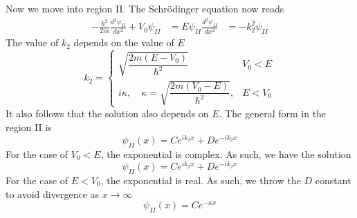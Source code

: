 \documentclass[../../../main.tex]{subfiles}
\begin{document}
Now we move into region II.
The Schrödinger equation now reads
\begin{align*}
    -\frac{\hbar^2}{2m} \frac{d^2 \psi_{II}}{dx^2} + V_0 \psi_{II} & =  E \psi_{II}
    \frac{d^2 \psi_{II}}{dx^2}                                     & = - k_2^2 \psi_{II}
\end{align*}
The value  of $k_2$ depends on the value of $E$
\begin{equation*}
    k_2 =
    \begin{cases}
        \sqrt{\dfrac{2 m (E - V_0)}{\hbar^2}}                           & V_0<E   \\
        i \kappa, \quad \kappa = \sqrt{\dfrac{2 m (V_0 - E)}{\hbar^2}}, & E < V_0
    \end{cases}
\end{equation*}
It also follows that the solution also depends on $E$.
The general form in the region II is
\begin{equation*}
    \psi_{II}(x)=C e^{i k_2 x} + D e^{-i k_2 x}
\end{equation*}
For the case of $V_0<E$, the exponential is complex.
As such, we have the solution
\begin{equation*}
    \psi_{II}(x) = C e^{i k_2 x} + D e^{-i k_2 x}
\end{equation*}
For the case of $E<V_0$, the exponential is real.
As such, we throw the $D$ constant to avoid divergence as $x \rightarrow \infty$
\begin{equation*}
    \psi_{II}(x) =C e^{-\kappa x}
\end{equation*}
\end{document}

